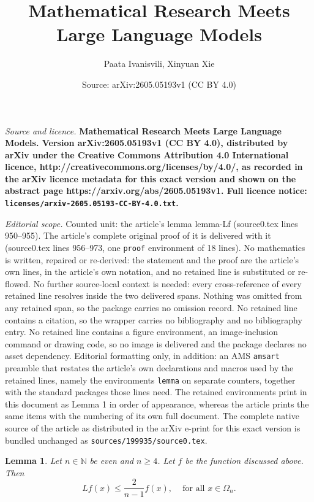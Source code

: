 \documentclass[10pt,a4paper]{amsart}
\title{\bf Mathematical Research Meets Large Language Models}
\author{Paata Ivanisvili, Xinyuan Xie}
\date{Source: arXiv:2605.05193v1 (CC BY 4.0)}
\newtheorem{lemma}{Lemma}
\begin{document}
\maketitle

\noindent\emph{Source and licence.} \bf Mathematical Research Meets Large Language Models. Version arXiv:2605.05193v1 (CC BY 4.0), distributed by arXiv under the Creative Commons Attribution 4.0 International licence, http://creativecommons.org/licenses/by/4.0/, as recorded in the arXiv licence metadata for this exact version and shown on the abstract page https://arxiv.org/abs/2605.05193v1. Full licence notice: \texttt{licenses/arxiv-2605.05193-CC-BY-4.0.txt}.\par\smallskip

\noindent\textit{Editorial scope.} Counted unit: the article's lemma lemma-Lf (source0.tex lines 950--955). The article's complete original proof of it is delivered with it (source0.tex lines 956--973, one \texttt{proof} environment of 18 lines). No mathematics is written, repaired or re-derived: the statement and the proof are the article's own lines, in the article's own notation, and no retained line is substituted or re-flowed.  No further source-local context is needed: every cross-reference of every retained line resolves inside the two delivered spans.  Nothing was omitted from any retained span, so the package carries no omission record.  No retained line contains a citation, so the wrapper carries no bibliography and no bibliography entry.  No retained line contains a figure environment, an image-inclusion command or drawing code, so no image is delivered and the package declares no asset dependency.  Editorial formatting only, in addition: an AMS \texttt{amsart} preamble that restates the article's own declarations and macros used by the retained lines, namely the environments \texttt{lemma} on separate counters, together with the standard packages those lines need.  The retained environments print in this document as Lemma 1 in order of appearance, whereas the article prints the same items with the numbering of its own full document.  The complete native source of the article as distributed in the arXiv e-print for this exact version is bundled unchanged as \texttt{sources/199935/source0.tex}.
\begin{lemma}\label{lemma-Lf}
Let $n\in \mathbb{N}$ be even and $n \geq 4$. Let $f$ be the function discussed above. Then
\[
Lf(x) \leq \frac{2}{n-1} f(x), \, \quad \text{for all } x \in \Omega_n.
\]
\end{lemma}
\end{document}
